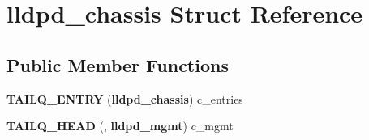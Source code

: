 \section{lldpd\-\_\-chassis \-Struct \-Reference}
\label{structlldpd__chassis}
\subsection*{\-Public \-Member \-Functions}
\begin{DoxyCompactItemize}
\item 
{\bfseries \-T\-A\-I\-L\-Q\-\_\-\-E\-N\-T\-R\-Y} ({\bf lldpd\-\_\-chassis}) c\-\_\-entries\label{structlldpd__chassis_a2f92a98c4ccedc7f8e5d9d58e2e72ff6}

\item 
{\bfseries \-T\-A\-I\-L\-Q\-\_\-\-H\-E\-A\-D} (, {\bf lldpd\-\_\-mgmt}) c\-\_\-mgmt\label{structlldpd__chassis_af258b7a2f6563939372b5db5e83ca4a1}

\end{DoxyCompactItemize}
